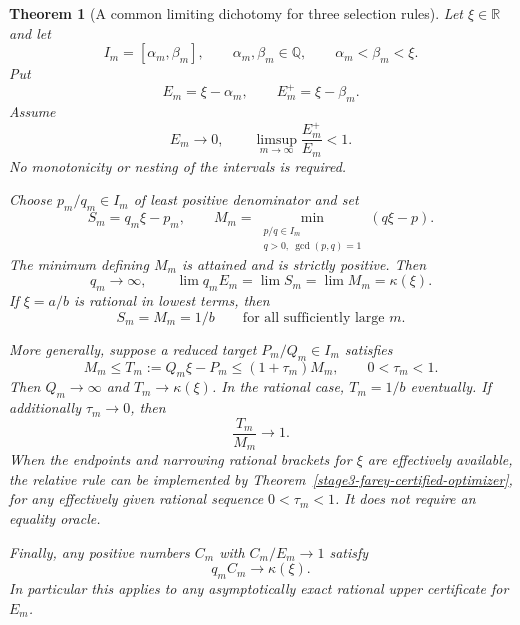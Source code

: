 \documentclass[11pt,a4paper]{article}
\newtheorem{theorem}{Theorem}[section]
\theoremstyle{definition}
\theoremstyle{remark}
\begin{document}
\begin{theorem}[A common limiting dichotomy for three selection rules]
\label{unified-selection-window-dichotomy}
Let $\xi\in\mathbb R$ and let
\[
 I_m=[\alpha_m,\beta_m],\qquad
 \alpha_m,\beta_m\in\mathbb Q,
 \qquad \alpha_m<\beta_m<\xi.
\]
Put
\[
 E_m=\xi-\alpha_m,\qquad E_m^+=\xi-\beta_m.
\]
Assume
\begin{equation}\label{unified-selection-width-hypothesis}
 E_m\longrightarrow0,
 \qquad \limsup_{m\to\infty}\frac{E_m^+}{E_m}<1.
\end{equation}
No monotonicity or nesting of the intervals is required.

Choose $p_m/q_m\in I_m$ of least positive denominator and set
\[
 S_m=q_m\xi-p_m,\qquad
 M_m=\min_{\substack{p/q\in I_m\\q>0,\ \gcd(p,q)=1}}
                     (q\xi-p).
\]
The minimum defining $M_m$ is attained and is strictly positive. Then
\begin{equation}\label{unified-selection-three-limits}
 q_m\longrightarrow\infty,
 \qquad
 \lim q_mE_m=\lim S_m=\lim M_m=\kappa(\xi).
\end{equation}
If $\xi=a/b$ is rational in lowest terms, then
\begin{equation}\label{unified-selection-rational-stabilization}
 S_m=M_m=1/b
 \qquad\text{for all sufficiently large }m.
\end{equation}

More generally, suppose a reduced target $P_m/Q_m\in I_m$ satisfies
\begin{equation}\label{unified-selection-relative-rule}
 M_m\le T_m:=Q_m\xi-P_m\le(1+\tau_m)M_m,
 \qquad 0<\tau_m<1.
\end{equation}
Then $Q_m\to\infty$ and $T_m\to\kappa(\xi)$. In the rational case,
$T_m=1/b$ eventually. If additionally $\tau_m\to0$, then
\begin{equation}\label{unified-selection-asymptotic-optimality}
 \frac{T_m}{M_m}\longrightarrow1.
\end{equation}
When the endpoints and narrowing rational brackets for $\xi$ are
effectively available, the relative rule can be implemented by
Theorem~\ref{stage3-farey-certified-optimizer}, for any effectively given
rational sequence $0<\tau_m<1$. It does not require an equality oracle.

Finally, any positive numbers $C_m$ with $C_m/E_m\to1$ satisfy
\begin{equation}\label{unified-selection-upper-limit}
 q_m C_m\longrightarrow\kappa(\xi).
\end{equation}
In particular this applies to any asymptotically exact rational upper
certificate for $E_m$.
\end{theorem}
\end{document}
